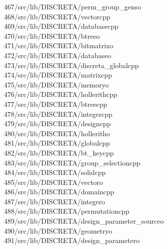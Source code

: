 \begin{tabbing}
467\>/src/lib/DISCRETA/perm\_group\_genso\\[0pt]
468\>/src/lib/DISCRETA/vectorcpp\\[0pt]
469\>/src/lib/DISCRETA/databasecpp\\[0pt]
470\>/src/lib/DISCRETA/btreeo\\[0pt]
471\>/src/lib/DISCRETA/bitmatrixo\\[0pt]
472\>/src/lib/DISCRETA/databaseo\\[0pt]
473\>/src/lib/DISCRETA/discreta\_globalcpp\\[0pt]
474\>/src/lib/DISCRETA/matrixcpp\\[0pt]
475\>/src/lib/DISCRETA/memoryo\\[0pt]
476\>/src/lib/DISCRETA/hollerithcpp\\[0pt]
477\>/src/lib/DISCRETA/btreecpp\\[0pt]
478\>/src/lib/DISCRETA/integercpp\\[0pt]
479\>/src/lib/DISCRETA/designcpp\\[0pt]
480\>/src/lib/DISCRETA/holleritho\\[0pt]
481\>/src/lib/DISCRETA/globalcpp\\[0pt]
482\>/src/lib/DISCRETA/bt\_keycpp\\[0pt]
483\>/src/lib/DISCRETA/group\_selectioncpp\\[0pt]
484\>/src/lib/DISCRETA/solidcpp\\[0pt]
485\>/src/lib/DISCRETA/vectoro\\[0pt]
486\>/src/lib/DISCRETA/domaincpp\\[0pt]
487\>/src/lib/DISCRETA/integero\\[0pt]
488\>/src/lib/DISCRETA/permutationcpp\\[0pt]
489\>/src/lib/DISCRETA/design\_parameter\_sourceo\\[0pt]
490\>/src/lib/DISCRETA/geometryo\\[0pt]
491\>/src/lib/DISCRETA/design\_parametero\\[0pt]

\end{tabbing}
